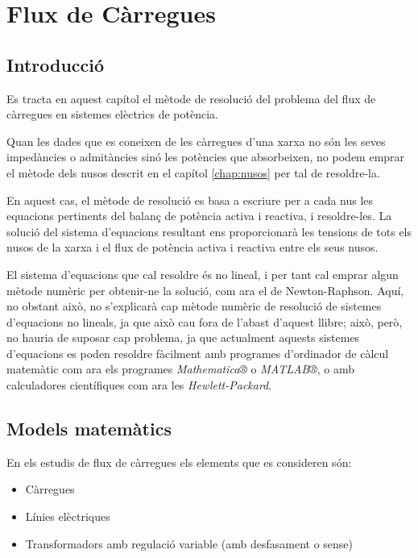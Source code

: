 \chapter{Flux de Càrregues}
\label{chap:flux_carregues}

\section{Introducció}

Es tracta en aquest capítol el mètode de resolució del problema del flux de càrregues en
sistemes elèctrics de potència.

Quan les dades que es coneixen de les càrregues d'una xarxa no són
les seves impedàncies o admitàncies sinó les potències que
absorbeixen, no podem emprar el mètode dels nusos descrit en el
capítol \ref{chap:nusos} per tal de resoldre-la.

En aquest cas, el mètode de resolució es basa a escriure per a cada
nus les equacions pertinents del balanç de potència activa i
reactiva, i resoldre-les. La solució del sistema d'equacions
resultant ens proporcionarà les tensions de tots els nusos de la
xarxa i el flux de potència activa i reactiva entre els seus nusos.

El sistema d'equacions que cal resoldre és no lineal, i per tant
cal emprar algun mètode numèric per obtenir-ne la solució, com ara el
de Newton-Raphson.  Aquí, no obstant això, no
s'explicarà cap mètode numèric de resolució de sistemes d'equacions
no lineals, ja que això cau fora de l'abast d'aquest llibre; això, però,  no hauria de suposar cap problema, ja que actualment aquests
sistemes d'equacions es poden resoldre fàcilment amb programes
d'ordinador de càlcul matemàtic com ara els programes
\emph{Mathematica®} o \emph{MATLAB®}, o amb calculadores
científiques com ara les \emph{Hewlett-Packard}.

\section{Models matemàtics} 

En els estudis de flux de càrregues els elements que es consideren són:
\begin{itemize}
   \item Càrregues
   \item Línies elèctriques
   \item Transformadors amb regulació variable (amb desfasament o sense)
\end{itemize}

